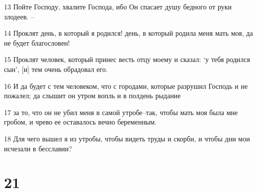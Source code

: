 \par 13 Пойте Господу, хвалите Господа, ибо Он спасает душу бедного от руки злодеев. --
\par 14 Проклят день, в который я родился! день, в который родила меня мать моя, да не будет благословен!
\par 15 Проклят человек, который принес весть отцу моему и сказал: `у тебя родился сын', [и] тем очень обрадовал его.
\par 16 И да будет с тем человеком, что с городами, которые разрушил Господь и не пожалел; да слышит он утром вопль и в полдень рыдание
\par 17 за то, что он не убил меня в самой утробе--так, чтобы мать моя была мне гробом, и чрево ее оставалось вечно беременным.
\par 18 Для чего вышел я из утробы, чтобы видеть труды и скорби, и чтобы дни мои исчезали в бесславии?

\chapter{21}

